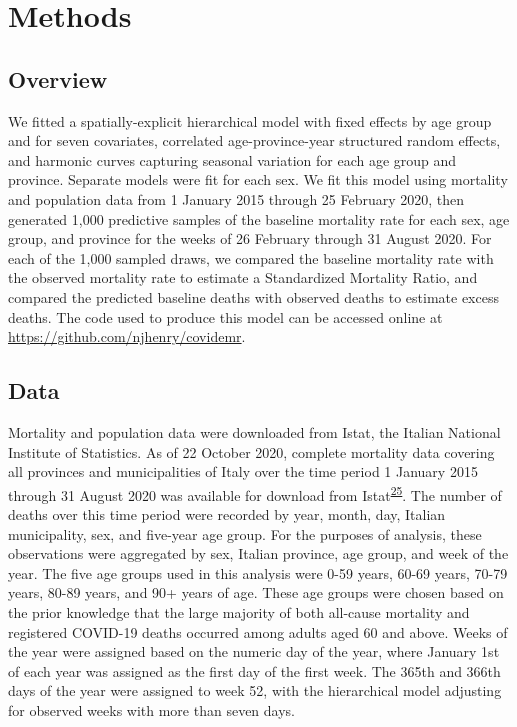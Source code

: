 \documentclass[
]{article}
\begin{document}
\hypertarget{methods}{%
\section{Methods}\label{methods}}

\hypertarget{overview}{%
\subsection{Overview}\label{overview}}

We fitted a spatially-explicit hierarchical model with fixed effects by age group and for seven covariates, correlated age-province-year structured random effects, and harmonic curves capturing seasonal variation for each age group and province. Separate models were fit for each sex. We fit this model using mortality and population data from 1 January 2015 through 25 February 2020, then generated 1,000 predictive samples of the baseline mortality rate for each sex, age group, and province for the weeks of 26 February through 31 August 2020. For each of the 1,000 sampled draws, we compared the baseline mortality rate with the observed mortality rate to estimate a Standardized Mortality Ratio, and compared the predicted baseline deaths with observed deaths to estimate excess deaths. The code used to produce this model can be accessed online at \url{https://github.com/njhenry/covidemr}.

\hypertarget{data}{%
\subsection{Data}\label{data}}

Mortality and population data were downloaded from Istat, the Italian National Institute of Statistics. As of 22 October 2020, complete mortality data covering all provinces and municipalities of Italy over the time period 1 January 2015 through 31 August 2020 was available for download from Istat\textsuperscript{\protect\hyperlink{ref-ItalianNationalInstituteofStatisticsIstat2020a}{25}}⁠. The number of deaths over this time period were recorded by year, month, day, Italian municipality, sex, and five-year age group. For the purposes of analysis, these observations were aggregated by sex, Italian province, age group, and week of the year. The five age groups used in this analysis were 0-59 years, 60-69 years, 70-79 years, 80-89 years, and 90+ years of age. These age groups were chosen based on the prior knowledge that the large majority of both all-cause mortality and registered COVID-19 deaths occurred among adults aged 60 and above. Weeks of the year were assigned based on the numeric day of the year, where January 1st of each year was assigned as the first day of the first week. The 365th and 366th days of the year were assigned to week 52, with the hierarchical model adjusting for observed weeks with more than seven days.
\end{document}
